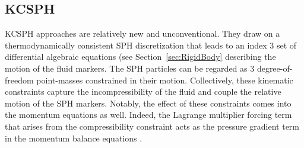 \subsection{KCSPH}
\label{sec:KCSPH}
KCSPH approaches are relatively new and unconventional. They draw on a thermodynamically consistent SPH discretization \cite{espanol_smoothed_2003} that leads to an index 3 set of differential algebraic equations (see Section~\ref{sec:RigidBody} describing the motion of the fluid markers. The SPH particles can be regarded as 3 degree-of-freedom point-masses constrained in their motion. Collectively, these kinematic constraints capture the incompressibility of the fluid and couple the relative motion of the SPH markers. Notably, the effect of these constraints comes into the momentum equations as well. Indeed, the Lagrange multiplier forcing term that arises from the compressibility constraint acts as the pressure gradient term in the momentum balance equations \cite{espanol_smoothed_2003,constrFluid2007,claudeIncompFluids2012,hammadConstrFluid2018}. 

